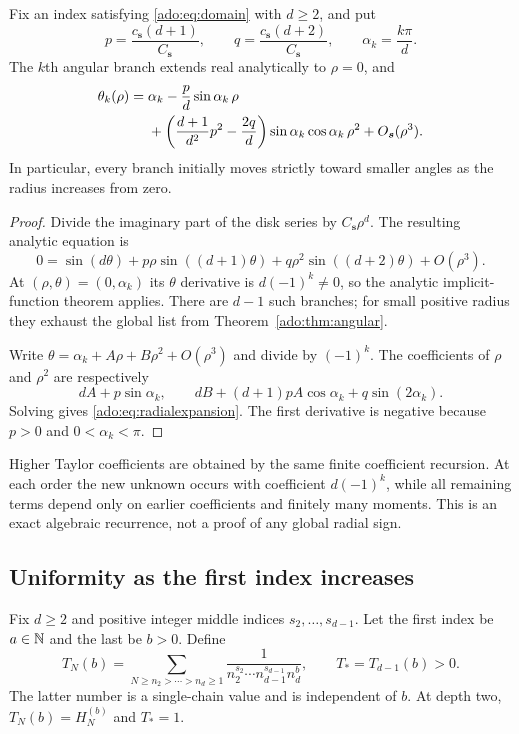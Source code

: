 \begin{theorem}
\label{ado:thm:radialexpansion}
Fix an index satisfying \eqref{ado:eq:domain} with $d\ge2$, and put
\[
 p=\frac{c_{\boldsymbol{s}}(d+1)}{C_{\boldsymbol{s}}},\qquad
 q=\frac{c_{\boldsymbol{s}}(d+2)}{C_{\boldsymbol{s}}},\qquad
 \alpha_k=\frac{k\pi}{d}.
\]
The $k$th angular branch extends real analytically to $\rho=0$, and
\begin{align}
 \theta_k(\rho)={}&\alpha_k
 -\frac{p}{d}\sin\alpha_k\,\rho \notag\\
 &+\left(\frac{d+1}{d^2}p^2-\frac{2q}{d}\right)
       \sin\alpha_k\cos\alpha_k\,\rho^2
 +O_{\boldsymbol{s}}(\rho^3).
 \label{ado:eq:radialexpansion}
\end{align}
In particular, every branch initially moves strictly toward smaller
angles as the radius increases from zero.
\end{theorem}
\begin{proof}
Divide the imaginary part of the disk series by $C_{\boldsymbol{s}}\rho^d$.
The resulting analytic equation is
\[
 0=\sin(d\theta)+p\rho\sin((d+1)\theta)
                   +q\rho^2\sin((d+2)\theta)+O(\rho^3).
\]
At $(\rho,\theta)=(0,\alpha_k)$ its $\theta$ derivative is
$d(-1)^k\ne0$, so the analytic implicit-function theorem applies.
There are $d-1$ such branches; for small positive radius they exhaust
the global list from Theorem~\ref{ado:thm:angular}.

Write $\theta=\alpha_k+A\rho+B\rho^2+O(\rho^3)$ and divide by
$(-1)^k$. The coefficients of $\rho$ and $\rho^2$ are respectively
\[
 dA+p\sin\alpha_k,
 \qquad dB+(d+1)pA\cos\alpha_k+q\sin(2\alpha_k).
\]
Solving gives \eqref{ado:eq:radialexpansion}. The first derivative is
negative because $p>0$ and $0<\alpha_k<\pi$.
\end{proof}
Higher Taylor coefficients are obtained by the same finite coefficient
recursion. At each order the new unknown occurs with coefficient
$d(-1)^k$, while all remaining terms depend only on earlier
coefficients and finitely many moments. This is an exact algebraic
recurrence, not a proof of any global radial sign.

\subsection{Uniformity as the first index increases}
Fix $d\ge2$ and positive integer middle indices
$s_2,\ldots,s_{d-1}$. Let the first index be $a\in\mathbb N$ and the
last be $b>0$. Define
\[
 T_N(b)=\sum_{N\ge n_2>\cdots>n_d\ge1}
       \frac1{n_2^{s_2}\cdots n_{d-1}^{s_{d-1}}n_d^b},
 \qquad T_*=T_{d-1}(b)>0.
\]
The latter number is a single-chain value and is independent of $b$.
At depth two, $T_N(b)=H_N^{(b)}$ and $T_*=1$.

